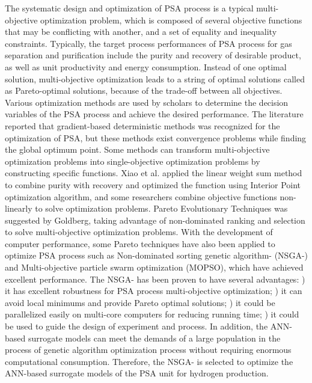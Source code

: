 \documentclass[preprint,12pt]{elsarticle}
\begin{document}
	The systematic design and optimization of PSA process is a typical multi-objective optimization problem, which is composed of several objective functions that may be conflicting with another, and a set of equality and inequality constraints. Typically, the target process performances of PSA process for gas separation and purification include the purity and recovery of desirable product, as well as unit productivity and energy consumption. Instead of one optimal solution, multi-objective optimization leads to a string of optimal solutions called as Pareto-optimal solutions, because of the trade-off between all objectives. Various optimization methods are used by scholars to determine the decision variables of the PSA process and achieve the desired performance. The literature reported that gradient-based deterministic methods was recognized for the optimization of PSA\cite{RN33,RN41,RN42}, but these methods exist convergence problems while finding the global optimum point\cite{RN43}. Some methods can transform multi-objective optimization problems into single-objective optimization problems by constructing specific functions. Xiao et al. applied the linear weight sum method to combine purity with recovery and optimized the function using Interior Point optimization algorithm\cite{RN19,RN44}, and some researchers combine objective functions non-linearly to solve optimization problems\cite{RN11,RN34}. Pareto Evolutionary Techniques was suggested by Goldberg, taking advantage of non-dominated ranking and selection to solve multi-objective optimization problems\cite{RN45}. With the development of computer performance, some Pareto techniques have also been applied to optimize PSA process such as Non-dominated sorting genetic algorithm-\uppercase\expandafter{} (NSGA-\uppercase\expandafter{})\cite{RN29,RN32,RN34,RN46} and Multi-objective particle swarm optimization (MOPSO)\cite{RN11}, which have achieved excellent performance. The NSGA-\uppercase\expandafter{} has been proven to have several advantages: \uppercase\expandafter{}) it has excellent robustness for PSA process multi-objective optimization; \uppercase\expandafter{}) it can avoid local minimums and provide Pareto optimal solutions; \uppercase\expandafter{}) it could be parallelized easily on multi-core computers for reducing running time\cite{RN47}; \uppercase\expandafter{}) it could be used to guide the design of experiment and process. In addition, the ANN-based surrogate models can meet the demands of a large population in the process of genetic algorithm optimization process without requiring enormous computational consumption. Therefore, the NSGA-\uppercase\expandafter{} is selected to optimize the ANN-based surrogate models of the PSA unit for hydrogen production.
	
\end{document}
